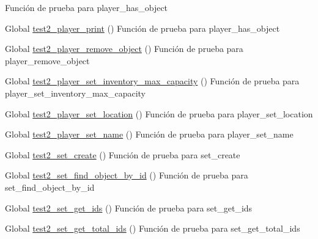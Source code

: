 \begin{DoxyRefList}
%
Función de prueba para player\+\_\+has\+\_\+object  
\item[Global \mbox{\hyperlink{player__test_8c_a46b5c792a37831e8c142d4c32b9767f7}{test2\+\_\+player\+\_\+print}} ()]\label{test__test000183}%
%
Función de prueba para player\+\_\+has\+\_\+object  
\item[Global \mbox{\hyperlink{player__test_8c_af9e74e12ad6961761f1ff61afa56be3e}{test2\+\_\+player\+\_\+remove\+\_\+object}} ()]\label{test__test000167}%
%
Función de prueba para player\+\_\+remove\+\_\+object  
\item[Global \mbox{\hyperlink{player__test_8c_a25f52636fb912ac120d40e17f70554fb}{test2\+\_\+player\+\_\+set\+\_\+inventory\+\_\+max\+\_\+capacity}} ()]\label{test__test000180}%
%
Función de prueba para player\+\_\+set\+\_\+inventory\+\_\+max\+\_\+capacity  
\item[Global \mbox{\hyperlink{player__test_8c_a2c702753d9e2e3df9ef4abf2d1b9bc8d}{test2\+\_\+player\+\_\+set\+\_\+location}} ()]\label{test__test000170}%
%
Función de prueba para player\+\_\+set\+\_\+location  
\item[Global \mbox{\hyperlink{player__test_8c_a6e7ce8ff791f4bf63749df647a44263f}{test2\+\_\+player\+\_\+set\+\_\+name}} ()]\label{test__test000154}%
%
Función de prueba para player\+\_\+set\+\_\+name  
\item[Global \mbox{\hyperlink{set__test_8c_abed3d273788e23fc31ae7f5ed59277b9}{test2\+\_\+set\+\_\+create}} ()]\label{test__test000186}%
%
Función de prueba para set\+\_\+create  
\item[Global \mbox{\hyperlink{set__test_8c_a5ab7b30d4a8ea609094642ab4b8608ee}{test2\+\_\+set\+\_\+find\+\_\+object\+\_\+by\+\_\+id}} ()]\label{test__test000205}%
%
Función de prueba para set\+\_\+find\+\_\+object\+\_\+by\+\_\+id  
\item[Global \mbox{\hyperlink{set__test_8c_aafec36ceb79db74e67643606bf07c401}{test2\+\_\+set\+\_\+get\+\_\+ids}} ()]\label{test__test000219}%
%
Función de prueba para set\+\_\+get\+\_\+ids  
\item[Global \mbox{\hyperlink{set__test_8c_a236ec2fe04b7272edab3005a73404830}{test2\+\_\+set\+\_\+get\+\_\+total\+\_\+ids}} ()]\label{test__test000199}%
%
Función de prueba para set\+\_\+get\+\_\+total\+\_\+ids  

\end{DoxyRefList}
